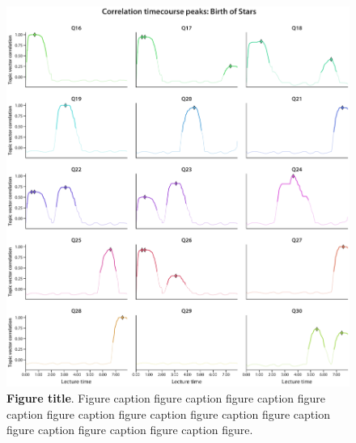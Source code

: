 \documentclass[10pt]{article}
\begin{document}
\begin{figure}[tp]
    \centering
    \includegraphics[width=\textwidth]{figs/bos-qcorrs-peaks}

    \caption{\textbf{Figure title}. Figure caption figure caption figure caption figure caption figure caption figure caption figure caption figure caption figure caption figure caption figure caption figure.}

    \label{fig:bos-peaks}
\end{figure}
\end{document}
